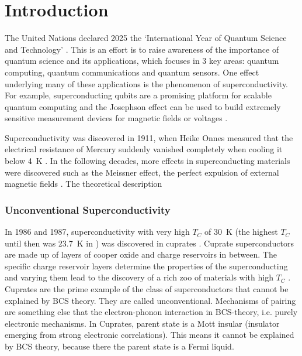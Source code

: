 \documentclass[../notes.tex]{subfiles}
\begin{document}
\raggedbottom
	
\chapter{Introduction}

The United Nations declared 2025 the `International Year of Quantum Science and Technology' \cite{unitednationsInternationalYearQuantum2024}.
This is an effort is to raise awareness of the importance of quantum science and its applications, which focuses in 3 key areas: quantum computing, quantum communications and quantum sensors.
One effect underlying many of these applications is the phenomenon of superconductivity.
For example, superconducting qubits are a promising platform for scalable quantum computing \cite{huangSuperconductingQuantumComputing2020, aruteQuantumSupremacyUsing2019} and the Josephson effect \cite{josephsonPossibleNewEffects1962} can be used to build extremely sensitive measurement devices for magnetic fields \cite{faleyHighTcSQUIDBiomagnetometers2017} or voltages \cite{klushinPresentFutureHightemperature2020}.

Superconductivity was discovered in 1911, when Heike Onnes measured that the electrical resistance of Mercury suddenly vanished completely when cooling it below \qty{4}{\kelvin} \cite{onnesFurtherExperimentsLiquid1991}.
In the following decades, more effects in superconducting materials were discovered such as the Meissner effect, the perfect expulsion of external magnetic fields \cite{meissnerNeuerEffektBei1933}.
The theoretical description 





\subsection*{Unconventional Superconductivity}

In 1986 and 1987, superconductivity with very high \(T_C\) of \qty{30}{\kelvin} (the highest \(T_C\) until then was \qty{23.7}{\kelvin} in ) was discovered in cuprates \cite{bednorzPossibleHighTc1986,uchidaHighTcSuperconductivity1987}.
Cuprate superconductors are made up of layers of cooper oxide and charge reservoirs in between.
The specific charge reservoir layers determine the properties of the superconducting and varying them lead to the discovery of a rich zoo of materials with high \(T_C\) \cite{rybickiPerspectivePhaseDiagram2016}.
Cuprates are the prime example of the class of superconductors that cannot be explained by BCS theory.
They are called unconventional.
Mechanisms of pairing are something else that the electron-phonon interaction in BCS-theory, i.e. purely electronic mechanisms.
In Cuprates, parent state is a Mott insular (insulator emerging from strong electronic correlations).
This means it cannot be explained by BCS theory, because there the parent state is a Fermi liquid.
\end{document}
